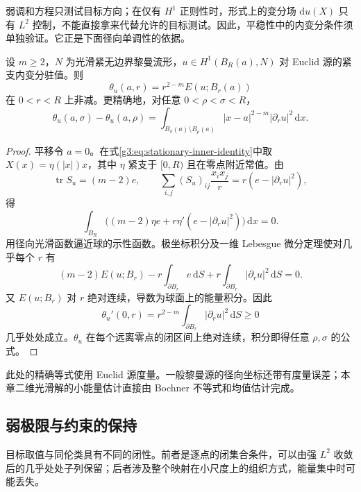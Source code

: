 弱调和方程只测试目标方向；在仅有 \(H^1\) 正则性时，形式上的变分场 \(\mathrm du(X)\) 只有 \(L^2\) 控制，不能直接拿来代替允许的目标测试。因此，平稳性中的内变分条件须单独验证。它正是下面径向单调性的依据。

\begin{proposition}\label{g3:prop:stationary-map-monotonicity}
	设 \(m\ge2\)，\(N\) 为光滑紧无边界黎曼流形，\(u\in H^1(B_R(a),N)\) 对 Euclid 源的紧支内变分驻值。则
	\[
		\theta_u(a,r)=r^{2-m}E(u;B_r(a))
	\]
	在 \(0<r<R\) 上非减。更精确地，对任意 \(0<\rho<\sigma<R\)，
	\begin{equation}\label{g3:eq:stationary-map-monotonicity}
		\theta_u(a,\sigma)-\theta_u(a,\rho)
		=\int_{B_\sigma(a)\setminus B_\rho(a)}|x-a|^{2-m}|\partial_ru|^2\,\mathrm dx.
	\end{equation}
\end{proposition}
\begin{proof}
	平移令 \(a=0\)。在式\eqref{g3:eq:stationary-inner-identity}中取 \(X(x)=\eta(|x|)x\)，其中 \(\eta\) 紧支于 \([0,R)\) 且在零点附近常值。由
	\[
		\operatorname{tr}S_u=(m-2)e,\qquad
		\sum_{i,j}(S_u)_{ij}\frac{x_ix_j}{r}=r(e-|\partial_ru|^2),
	\]
	得
	\[
		\int_{B_R}\bigl((m-2)\eta e+r\eta'(e-|\partial_ru|^2)\bigr)\,\mathrm dx=0.
	\]
	用径向光滑函数逼近球的示性函数。极坐标积分及一维 Lebesgue 微分定理使对几乎每个 \(r\) 有
	\[
		(m-2)E(u;B_r)-r\int_{\partial B_r}e\,\mathrm dS
		+r\int_{\partial B_r}|\partial_ru|^2\,\mathrm dS=0.
	\]
	又 \(E(u;B_r)\) 对 \(r\) 绝对连续，导数为球面上的能量积分。因此
	\[
		\theta_u'(0,r)=r^{2-m}\int_{\partial B_r}|\partial_ru|^2\,\mathrm dS\ge0
	\]
	几乎处处成立。\(\theta_u\) 在每个远离零点的闭区间上绝对连续，积分即得任意 \(\rho,\sigma\) 的公式。
\end{proof}

此处的精确等式使用 Euclid 源度量。一般黎曼源的径向坐标还带有度量误差；本章二维光滑解的小能量估计直接由 Bochner 不等式和均值估计完成。

\subsection{弱极限与约束的保持}
\label{g3:subsec:1802:04}

目标取值与同伦类具有不同的闭性。前者是逐点的闭集合条件，可以由强 \(L^2\) 收敛后的几乎处处子列保留；后者涉及整个映射在小尺度上的组织方式，能量集中时可能丢失。

